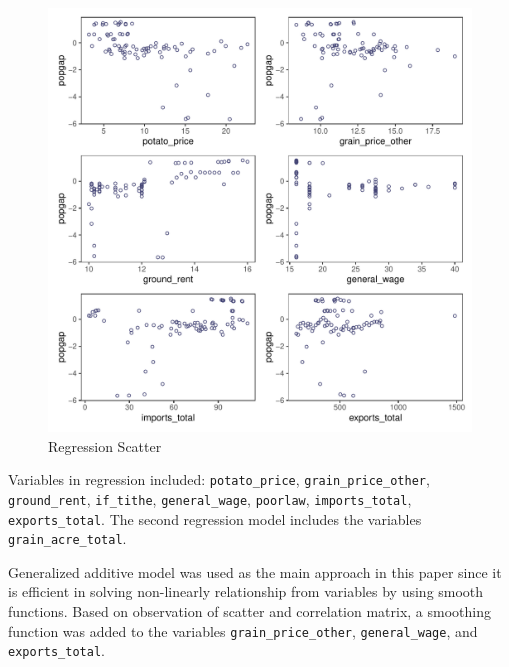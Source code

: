 \begin{figure}[h]
    \centering
    \caption{Regression Scatter}
    \includegraphics[width=.95\textwidth]{../03_outputs/regression_scatter.pdf}
\end{figure}

Variables in regression included: \texttt{potato\_price}, \texttt{grain\_price\_other}, \texttt{ground\_rent}, \texttt{if\_tithe}, \texttt{general\_wage}, \texttt{poorlaw}, \texttt{imports\_total}, \texttt{exports\_total}. The second regression model includes the variables \texttt{grain\_acre\_total}.

Generalized additive model was used as the main approach in this paper since it is efficient in solving non-linearly relationship from variables by using smooth functions. Based on observation of scatter and correlation matrix, a smoothing function was added to the variables \texttt{grain\_price\_other}, \texttt{general\_wage}, and \texttt{exports\_total}. 

